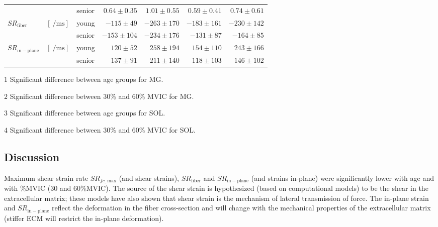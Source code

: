 \begin{table}[!htb]
\begin{center}
\begin{threeparttable}
\begin{tabular}{@{}lclrrrr@{}}
                  											&                   							     				& senior    & $0.64 \pm 0.35$   & $1.01 \pm 0.55$  &  $0.59 \pm 0.41$  & $0.74 \pm 0.61$   \\[4pt]
\multirow{2}{*}{$SR_{\mathrm{fiber}}$}\tnote{$2$, $3$}		& \multirow{2}{*}{$\left[\SI{}{\per\milli\second}\right]$} 		& young     & $-115 \pm 49$  	& $-263 \pm 170$   &  $-183 \pm 161$   & $-230 \pm 142$  \\
                  											&                   							     				& senior    & $-153 \pm 104$  	& $-234 \pm 176$   &  $-131 \pm 87$    & $-164 \pm 85$  \\[4pt]
\multirow{2}{*}{$SR_{\mathrm{in-plane}}$}\tnote{$2$, $3$}	& \multirow{2}{*}{$\left[\SI{}{\per\milli\second}\right]$} 		& young     & $120 \pm 52$   	& $258 \pm 194$    &  $154 \pm 110$    & $243 \pm 166$   \\
                  											&                   							     				& senior    & $137 \pm 91$   	& $211 \pm 140$    &  $118 \pm 103$    & $146 \pm 102$   \\ \midrule[0.3pt]\bottomrule[1pt]
\end{tabular}
\begin{tablenotes}[flushleft]\footnotesize
\item[$1$] Significant difference between age groups for MG.
\item[$2$] Significant difference between 30\% and 60\% MVIC for MG.
\item[$3$] Significant difference between age groups for SOL.
\item[$4$] Significant difference between 30\% and 60\% MVIC for SOL.
\end{tablenotes}
\end{threeparttable}
\end{center}
\vspace{-0.2cm}
\end{table}
\subsection{Discussion}
Maximum shear strain rate $SR_{fc\_\,\mathrm{max}}$ (and shear strains), $SR_\mathrm{fiber}$ and $SR_\mathrm{in-plane}$ (and strains in-plane) were significantly lower with age and with \%MVIC (30 and 60\%MVIC). 
The source of the shear strain is hypothesized (based on computational models) to be the shear in the extracellular matrix; these models have also shown that shear strain is the mechanism of lateral transmission of force. 
The in-plane strain and $SR_\mathrm{in-plane}$ reflect the deformation in the fiber cross-section and will change with the mechanical properties of the extracellular matrix (stiffer ECM will restrict the in-plane deformation). 
